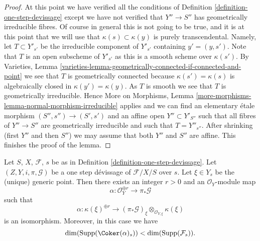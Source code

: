 \begin{proof}
\medskip\noindent
At this point we have verified all the conditions of
Definition \ref{definition-one-step-devissage}
except we have not verified that $Y'' \to S''$ has geometrically
irreducible fibres. Of course in general this is not going to be
true, and it is at this point that we will use that
$\kappa(s) \subset \kappa(y)$ is purely transcendental. Namely,
let $T \subset Y'_{s'}$ be the irreducible component of
$Y'_{s'}$ containing $y' = (y, s')$. Note that $T$ is an open subscheme
of $Y'_{s'}$ as this is a smooth scheme over $\kappa(s')$. By
Varieties,
Lemma \ref{varieties-lemma-geometrically-connected-if-connected-and-point}
we see that $T$ is geometrically connected because $\kappa(s') = \kappa(s)$
is algebraically closed in $\kappa(y') = \kappa(y)$.
As $T$ is smooth we see that $T$ is geometrically irreducible. Hence
More on Morphisms,
Lemma \ref{more-morphisms-lemma-normal-morphism-irreducible}
applies and we can find an elementary \'etale morphism
$(S'', s'') \to (S', s')$ and an affine open $Y'' \subset Y'_{S''}$
such that all fibres of $Y'' \to S''$ are geometrically irreducible
and such that $T = Y''_{s''}$. After shrinking (first $Y''$ and then $S''$)
we may assume that both $Y''$ and $S''$ are affine.
This finishes the proof of the lemma.
\end{proof}

\begin{lemma}
\label{lemma-existence-alpha}
Let $S$, $X$, $\mathcal{F}$, $s$ be as in
Definition \ref{definition-one-step-devissage}.
Let $(Z, Y, i, \pi, \mathcal{G})$ be a one step d\'evissage
of $\mathcal{F}/X/S$ over $s$.
Let $\xi \in Y_s$ be the (unique) generic point.
Then there exists an integer $r > 0$ and an $\mathcal{O}_Y$-module map
$$
\alpha : \mathcal{O}_Y^{\oplus r} \longrightarrow \pi_*\mathcal{G}
$$
such that
$$
\alpha :
\kappa(\xi)^{\oplus r}
\longrightarrow
(\pi_*\mathcal{G})_\xi \otimes_{\mathcal{O}_{Y, \xi}} \kappa(\xi)
$$
is an isomorphism. Moreover, in this case we have
$$
\dim(\text{Supp}(\Coker(\alpha)_s)) < \dim(\text{Supp}(\mathcal{F}_s)).
$$
\end{lemma}

